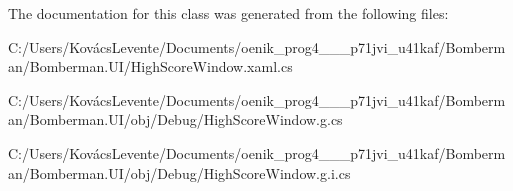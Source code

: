 The documentation for this class was generated from the following files\+:\begin{DoxyCompactItemize}
\item 
C\+:/\+Users/\+Kovács\+Levente/\+Documents/oenik\+\_\+prog4\+\_\+\_\+\_\+p71jvi\+\_\+u41kaf/\+Bomberman/\+Bomberman.\+U\+I/High\+Score\+Window.\+xaml.\+cs\item 
C\+:/\+Users/\+Kovács\+Levente/\+Documents/oenik\+\_\+prog4\+\_\+\_\+\_\+p71jvi\+\_\+u41kaf/\+Bomberman/\+Bomberman.\+U\+I/obj/\+Debug/High\+Score\+Window.\+g.\+cs\item 
C\+:/\+Users/\+Kovács\+Levente/\+Documents/oenik\+\_\+prog4\+\_\+\_\+\_\+p71jvi\+\_\+u41kaf/\+Bomberman/\+Bomberman.\+U\+I/obj/\+Debug/High\+Score\+Window.\+g.\+i.\+cs\end{DoxyCompactItemize}
